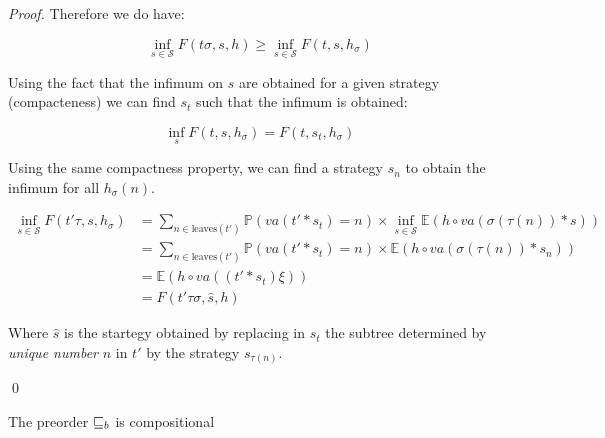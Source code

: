\begin{proof}
    Therefore we do have:

    \begin{equation*}
        \inf_{s \in \mathcal{S}} F(t\sigma, s, h) \geq \inf_{s \in \mathcal{S}} F (t,s,h_\sigma)
    \end{equation*}

    Using the fact that the infimum on $s$ are obtained 
    for a given strategy (compacteness) we can find $s_t$
    such that the infimum is obtained:
    
    \begin{equation*}
        \inf_s F (t,s,h_\sigma) = F(t,s_t, h_\sigma)
    \end{equation*}

    Using the same compactness property, we can find a strategy 
    $s_n$ to obtain the infimum for all  
    $h_\sigma (n)$. 

    \begin{align*}
        \inf_{s \in \mathcal{S}} F (t' \tau, s, h_\sigma) &= 
        \sum_{n \in \text{leaves}(t')} 
        \mathbb{P}( va(t' * s_t) = n ) \times \inf_{s \in \mathcal{S}} \mathbb{E}\left( h \circ va (
        \sigma(\tau(n)) * s) \right) \\
        &= 
        \sum_{n \in \text{leaves}(t')} 
        \mathbb{P}( va(t' * s_t) = n ) \times \mathbb{E}\left( h \circ va (
        \sigma(\tau(n)) * s_n) \right) \\
        &= 
        \mathbb{E} \left( h \circ va ((t' * s_t) \xi) \right)\\
        &= 
        F (t' \tau \sigma, \hat{s}, h)
    \end{align*}
    
    Where $\hat{s}$ is the startegy obtained by replacing in $s_t$ the subtree  
    determined by \emph{unique number} $n$
    in $t'$ by the strategy $s_{\tau(n)}$. 

    \qed
\end{proof}

\begin{lemma}[Compositionality]
    \label{lem:operiscomp}
    The preorder $\sqsubseteq_b$ is compositional
\end{lemma}

